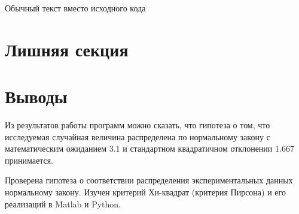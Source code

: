 \documentclass[a4paper,14pt]{article}
\begin{document}
Обычный текст вместо исходного кода
	
	
\section{Лишняя секция}


\section{Выводы}

Из результатов работы программ можно сказать, что гипотеза о том, что исследуемая случайная величина распределена по нормальному закону с математическим ожиданием 3.1 и стандартном квадратичном отклонении 1.667 принимается. 
 
Проверена гипотеза о соответствии распределения экспериментальных данных нормальному закону. Изучен критерий Хи-квадрат (критерия Пирсона) и его реализаций в Matlab и Python.
\end{document}
